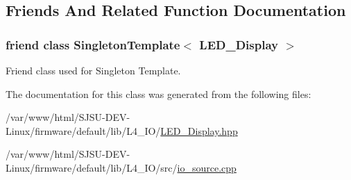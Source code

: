 \subsection{Friends And Related Function Documentation}
\subsubsection[{\texorpdfstring{Singleton\+Template$<$ L\+E\+D\+\_\+\+Display $>$}{SingletonTemplate< LED_Display >}}]{\setlength{\rightskip}{0pt plus 5cm}friend class {\bf Singleton\+Template}$<$ {\bf L\+E\+D\+\_\+\+Display} $>$\hspace{0.3cm}{\ttfamily [friend]}}\hypertarget{classLED__Display_a7a993cfbec5ab2677708ad0426cf843b}{}\label{classLED__Display_a7a993cfbec5ab2677708ad0426cf843b}


Friend class used for Singleton Template. 



The documentation for this class was generated from the following files\+:\begin{DoxyCompactItemize}
\item 
/var/www/html/\+S\+J\+S\+U-\/\+D\+E\+V-\/\+Linux/firmware/default/lib/\+L4\+\_\+\+I\+O/\hyperlink{LED__Display_8hpp}{L\+E\+D\+\_\+\+Display.\+hpp}\item 
/var/www/html/\+S\+J\+S\+U-\/\+D\+E\+V-\/\+Linux/firmware/default/lib/\+L4\+\_\+\+I\+O/src/\hyperlink{io__source_8cpp}{io\+\_\+source.\+cpp}\end{DoxyCompactItemize}
